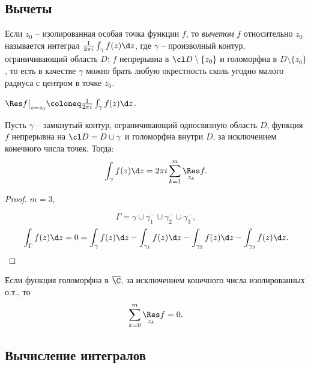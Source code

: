 \subsection{Вычеты}

\begin{definition}
	Если $z_0$ -- изолированная особая точка функции $f$, то \emph{вычетом} $f$ относительно $z_0$ называется интеграл $\frac{1}{2\pi i} \int_{\gamma } f(z)\d z$, где $\gamma $ -- произволный контур, ограничивающий область $D$: $f$ непрерывна в $\cl D \setminus \{z_0\}$ и голоморфна в $D \setminus \{z_0\}$, то есть в качестве $\gamma $ можно брать любую окрестность сколь угодно малого радиуса с центром в точке $z_0$.
	\begin{notation}
		$\Res f\big|_{z=z_0}\coloneq \frac{1}{2\pi i} \int_{\gamma } f(z)\d z$.
	\end{notation}
\end{definition}

\begin{theorem}
	Пусть $\gamma $ -- замкнутый контур, ограничивающий односвязную область $D$, функция $f$ непрерывна на $\cl D = D \cup \gamma $ и голоморфна внутри $D$, за исключением конечного числа точек. Тогда:
	\[
		\int_{\gamma } f(z)\d z = 2\pi i \sum_{k=1}^{m} \underset{z_k}{\Res} f.
	\]
\end{theorem}

\begin{proof}
	$m = 3$,
	\begin{figure}[H]
		\centering
		\label{fig:fig-16}
	\end{figure}
	\[
		\Gamma = \gamma \cup \gamma_{1}^{-} \cup \gamma_{2}^{-} \cup \gamma_{3}^{-},
	\]
	\[
		\int_{\Gamma } f(z)\d z = 0 = \int_{\gamma } f(z)\d z - \int_{\gamma _1} f(z)\d z - \int_{\gamma _2} f(z)\d z - \int_{\gamma _3} f(z)\d z.
	\]
\end{proof}

\begin{theorem}
	Если функция голоморфна в $\overline{\C} $, за исключением конечного числа изолированных о.т., то
	\[
		\sum_{k=0}^{m} \underset{z_k}{\Res} f = 0.
	\]
\end{theorem}

\subsection{Вычисление интегралов}

